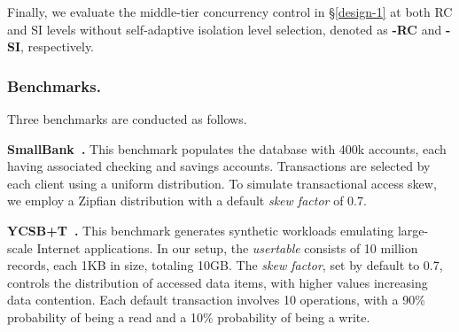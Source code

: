 Finally, we evaluate the middle-tier concurrency control in \S\ref{design-1} at both RC and SI levels without self-adaptive isolation level selection, denoted as \textbf{\sysname-RC} and \textbf{\sysname-SI}, respectively. 



\subsubsection{Benchmarks.} Three benchmarks are conducted as follows. %

\noindent\textbf{SmallBank~\cite{DBLP:conf/icde/AlomariCFR08}.} This benchmark populates the database with 400k accounts, each having associated checking and savings accounts. 
Transactions are selected by each client using a uniform distribution. To simulate transactional access skew, we employ a Zipfian distribution with a default \textit{skew factor} of 0.7.

\noindent\textbf{YCSB+T~\cite{DBLP:conf/icde/DeyFNR14}.} 
This benchmark generates synthetic workloads emulating large-scale Internet applications. In our setup, the \textit{usertable} consists of 10 million records, each 1KB in size, totaling 10GB. The \textit{skew factor}, set by default to 0.7, controls the distribution of accessed data items, with higher values increasing data contention. Each default transaction involves 10 operations, with a 90\% probability of being a read and a 10\% probability of being a write.


